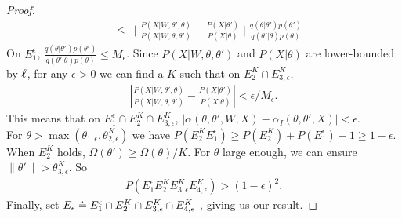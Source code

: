 \begin{proof}
\begin{align*}
& \leq \ \mid \frac{P(X | W, \theta' , \theta)}{P(X | W, \theta , \theta')} - \frac{P(X | \theta')}{P(X | \theta)}\mid  \frac{q(\theta | \theta')p(\theta')}{q(\theta' | \theta)p(\theta)}
\end{align*}
%
On $E^\epsilon_1$, $\frac{q(\theta | \theta')p(\theta')}{q(\theta' | \theta)p(\theta)} \le M_\epsilon$.
Since ${P(X | W, \theta , \theta')}$ and ${P(X | \theta)}$
are lower-bounded by $\ell$, for any $\epsilon > 0$ we can 
find a $K$ such that on $E^K_2 \cap E^K_{3,\epsilon}$,
\begin{align*}
|\frac{P(X | W, \theta' , \theta)}{P(X | W, \theta , \theta')} - 
   \frac{P(X | \theta')}{P(X | \theta)}| < \epsilon / M_\epsilon.
\end{align*}
This means that on $E^\epsilon_1 \cap E_2^K \cap E^K_{3,\epsilon}$,
$|\alpha(\theta, \theta', W, X) - \alpha_I(\theta, \theta', X)| < \epsilon$.\\
For $\theta > \max (\theta_{1,\epsilon},\theta^K_{2,\epsilon})$ 
we have 
$
P(E^K_2 E^\epsilon_1) \ge P(E^K_2) + P(E_1^\epsilon) - 1 \ge 1 - \epsilon.
$\\
When $E^K_2$ holds, $\Omega(\theta') \ge \Omega(\theta)/K$.
For $\theta$ large enough, we can ensure $ \| \theta' \| > {\theta}^K_{3,\epsilon}$.
So \begin{align*}
P(E_1^\epsilon E_2^K E_{3,\epsilon}^K E_{4,\epsilon}^K) > (1- \epsilon)^2.
\end{align*} 
Finally, set $E_\epsilon \doteq E_1^\epsilon \cap E_2^K \cap E_{3,\epsilon}^K \cap E_{4,\epsilon}^K$ , giving us our result.


\end{proof}
